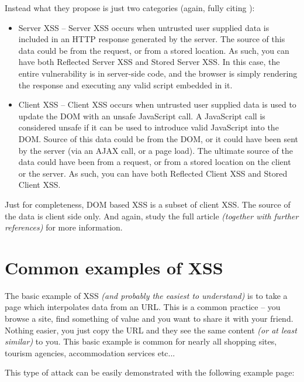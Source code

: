 Instead what they propose is just two categories (again, fully citing \cite{xss_owasp_types}):

\begin{itemize}
  \item  Server XSS -- Server XSS occurs when untrusted user supplied data is included in an HTTP
        response generated by the server. The source of this data could be from the request, or from
        a stored location. As such, you can have both Reflected Server XSS and Stored Server XSS. In
        this case, the entire vulnerability is in server-side code, and the browser is simply
        rendering the response and executing any valid script embedded in it.
  \item  Client XSS -- Client XSS occurs when untrusted user supplied data is used to update the DOM
        with an unsafe JavaScript call. A JavaScript call is considered unsafe if it can be used to
        introduce valid JavaScript into the DOM. Source of this data could be from the DOM, or
        it could have been sent by the server (via an AJAX call, or a page load). The ultimate
        source of the data could have been from a request, or from a stored location on the client
        or the server. As such, you can have both Reflected Client XSS and Stored Client XSS.
\end{itemize}

Just for completeness, DOM based XSS is a subset of client XSS. The source of the data is client
side only. And again, study the full article \cite{xss_owasp_types} \emph{(together with further
  references)} for more information.

\section{Common examples of XSS}

The basic example of XSS \emph{(and probably the easiest to understand)} is to take a page which
interpolates data from an URL. This is a common practice -- you browse a site, find something of
value and you want to share it with your friend. Nothing easier, you just copy the URL and they see
the same content \emph{(or at least similar)} to you. This basic example is common for nearly all
shopping sites, tourism agencies, accommodation services etc...

This type of attack can be easily demonstrated with the following example page:
\bigskip

